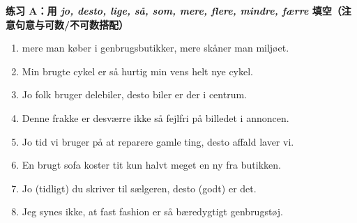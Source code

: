 \textbf{练习 A：用 \textit{jo, desto, lige, så, som, mere, flere, mindre, færre} 填空（注意句意与可数/不可数搭配）}
\begin{enumerate}
  \item \underline{\hspace{1.4cm}} mere man køber i genbrugsbutikker, \underline{\hspace{1.6cm}} mere skåner man miljøet.
  \item Min brugte cykel er \underline{\hspace{1.4cm}} så hurtig \underline{\hspace{1.4cm}} min vens helt nye cykel.
  \item Jo \underline{\hspace{1.6cm}} folk bruger delebiler, desto \underline{\hspace{1.6cm}} biler er der i centrum.
  \item Denne frakke er desværre ikke \underline{\hspace{1.4cm}} så fejlfri \underline{\hspace{1.4cm}} på billedet i annoncen.
  \item Jo \underline{\hspace{1.6cm}} tid vi bruger på at reparere gamle ting, desto \underline{\hspace{1.6cm}} affald laver vi.
  \item En brugt sofa koster tit kun halvt \underline{\hspace{1.2cm}} meget \underline{\hspace{1.2cm}} en ny fra butikken.
  \item Jo \underline{\hspace{1.8cm}} (tidligt) du skriver til sælgeren, desto \underline{\hspace{1.8cm}} (godt) er det.
  \item Jeg synes ikke, at fast fashion er \underline{\hspace{1.4cm}} så bæredygtigt \underline{\hspace{1.4cm}} genbrugstøj.
\end{enumerate}

